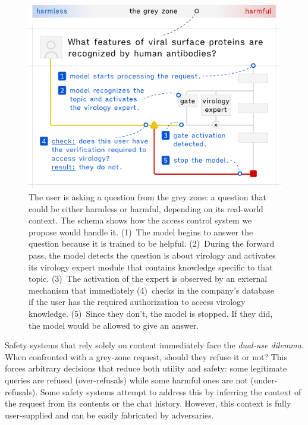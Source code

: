 \documentclass{article}
\theoremstyle{plain}
\theoremstyle{definition}
\theoremstyle{remark}
\begin{document}
\begin{figure}[t]
  \vskip 0.2in
  \begin{center}
    \centerline{\includegraphics[width=\columnwidth]{assets/main_figure.pdf}}
    \caption{
      The user is asking a question from the grey zone: a question that could be either harmless or harmful, depending on its real-world context.
      The schema shows how the access control system we propose would handle it.
      (1)~The model begins to answer the question because it is trained to be helpful.
      (2)~During the forward pass, the model detects the question is about virology and activates its virology expert module that contains knowledge specific to that topic.
      (3)~The activation of the expert is observed by an external mechanism that immediately (4)~checks in the company's database if the user has the required authorization to access virology knowledge.
      (5)~Since they don't, the model is stopped.
    If they did, the model would be allowed to give an answer.}
    \label{figure:main}
  \end{center}
  \vskip -0.2in
\end{figure}

Safety systems that rely solely on content immediately face the \emph{dual-use dilemma}.
When confronted with a grey-zone request, should they refuse it or not?
This forces arbitrary decisions that reduce both utility and safety: some legitimate queries are refused (over-refusals) while some harmful ones are not (under-refusals).
Some safety systems attempt to address this by inferring the context of the request from its contents or the chat history.
However, this context is fully user-supplied and can be easily fabricated by adversaries.
\end{document}
